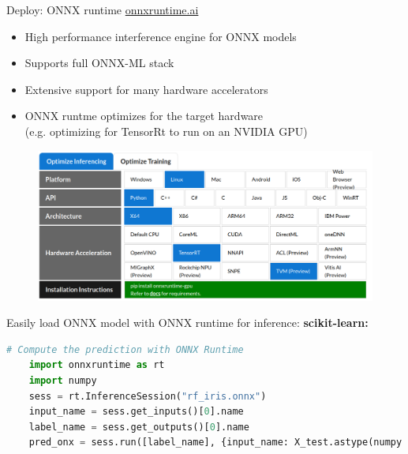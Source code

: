 \documentclass[aspectratio=169,9pt]{beamer}
\begin{document}
\begin{frame}[t]{Deploy: ONNX runtime}{\color{blue} \href{https://onnxruntime.ai/}{onnxruntime.ai}}
  \begin{itemize}
    \item High performance interference engine for ONNX models
    \item Supports full ONNX-ML stack
    \item Extensive support for many hardware accelerators
    \item ONNX runtme optimizes for the target hardware \\
          (e.g. optimizing for TensorRt to run on an NVIDIA GPU)
  \end{itemize}
  \begin{figure}
    \centering
    \includegraphics[width=.6\textwidth]{ONNX-runtime-get-started-chart.png}
  \end{figure}
\end{frame}


\begin{frame}[t,fragile]{Easily load ONNX model with ONNX runtime for inference:}
  \vspace*{1em}
  \textbf{scikit-learn:}
  \begin{lstlisting}[language=Python]
    # Compute the prediction with ONNX Runtime
    import onnxruntime as rt
    import numpy
    sess = rt.InferenceSession("rf_iris.onnx")
    input_name = sess.get_inputs()[0].name
    label_name = sess.get_outputs()[0].name
    pred_onx = sess.run([label_name], {input_name: X_test.astype(numpy.float32)})[0]
  \end{lstlisting}
\end{frame}


\end{document}
